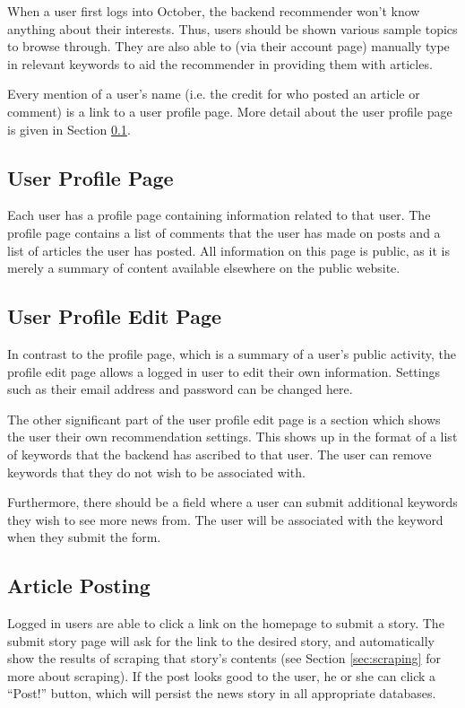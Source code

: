 \documentclass[11pt,letterpaper,titlepage]{article}
\begin{document}
When a user first logs into October, the backend recommender won't know anything about their interests.
Thus, users should be shown various sample topics to browse through.
They are also able to (via their account page) manually type in relevant keywords to aid the recommender in providing them with articles.

Every mention of a user's name (i.e. the credit for who posted an article or comment) is a link to a user profile page. More detail about the user profile page is given in Section \ref{sec:profilepage}.

\subsection{User Profile Page}
\label{sec:profilepage}
Each user has a profile page containing information related to that user.
The profile page contains a list of comments that the user has made on posts and a list of articles the user has posted.
All information on this page is public, as it is merely a summary of content available elsewhere on the public website.

\subsection{User Profile Edit Page}
In contrast to the profile page, which is a summary of a user's public activity, the profile edit page allows a logged in user to edit their own information.
Settings such as their email address and password can be changed here.

The other significant part of the user profile edit page is a section which shows the user their own recommendation settings.
This shows up in the format of a list of keywords that the backend has ascribed to that user.
The user can remove keywords that they do not wish to be associated with.

Furthermore, there should be a field where a user can submit additional keywords they wish to see more news from.
The user will be associated with the keyword when they submit the form.

\subsection{Article Posting}
Logged in users are able to click a link on the homepage to submit a story.
The submit story page will ask for the link to the desired story, and automatically show the results of scraping that story's contents (see Section \ref{sec:scraping} for more about scraping).
If the post looks good to the user, he or she can click a ``Post!'' button, which will persist the news story in all appropriate databases.
\end{document}
